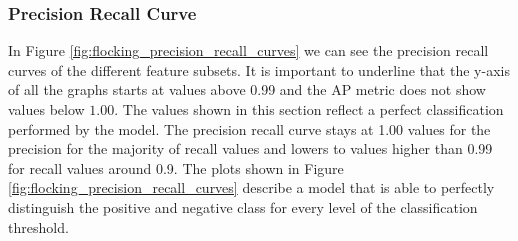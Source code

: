 \documentclass[../../Thesis.tex]{subfiles}
\begin{document}
			\subsubsection{Precision Recall Curve}
				In Figure \ref{fig:flocking_precision_recall_curves} we can see the precision recall curves of the different feature subsets.  It is important to underline that the y-axis of all the graphs starts at values above 0.99 and the AP metric does not show values below $1.00$. The values shown in this section reflect a perfect classification performed by the model. The precision recall curve stays at 1.00 values for the precision for the majority of recall values and lowers to values higher than 0.99 for recall values around 0.9. The plots shown in Figure \ref{fig:flocking_precision_recall_curves} describe a model that is able to perfectly distinguish the positive and negative class for every level of the classification threshold. 
\end{document}
